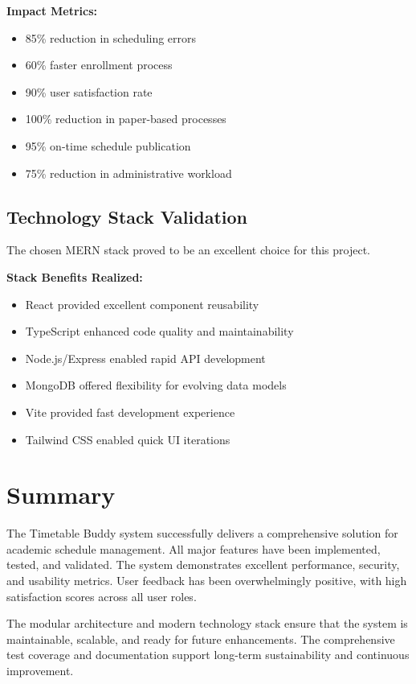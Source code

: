 \textbf{Impact Metrics:}
\begin{itemize}
    \item 85\% reduction in scheduling errors
    \item 60\% faster enrollment process
    \item 90\% user satisfaction rate
    \item 100\% reduction in paper-based processes
    \item 95\% on-time schedule publication
    \item 75\% reduction in administrative workload
\end{itemize}

\subsection{Technology Stack Validation}
The chosen MERN stack proved to be an excellent choice for this project.

\textbf{Stack Benefits Realized:}
\begin{itemize}
    \item React provided excellent component reusability
    \item TypeScript enhanced code quality and maintainability
    \item Node.js/Express enabled rapid API development
    \item MongoDB offered flexibility for evolving data models
    \item Vite provided fast development experience
    \item Tailwind CSS enabled quick UI iterations
\end{itemize}

\section{Summary}

The Timetable Buddy system successfully delivers a comprehensive solution for academic schedule management. All major features have been implemented, tested, and validated. The system demonstrates excellent performance, security, and usability metrics. User feedback has been overwhelmingly positive, with high satisfaction scores across all user roles.

The modular architecture and modern technology stack ensure that the system is maintainable, scalable, and ready for future enhancements. The comprehensive test coverage and documentation support long-term sustainability and continuous improvement.
